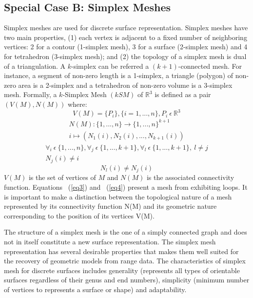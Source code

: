\documentclass{InsightArticle}
\begin{document}
\subsection{Special Case B: Simplex Meshes}
Simplex meshes are used for discrete surface representation. Simplex meshes have two main properties, (1) each vertex is adjacent to a fixed number of neighboring vertices: 2 for a contour (1-simplex mesh), 3 for a surface (2-simplex mesh) and 4 for tetrahedron (3-simplex mesh); and (2) the topology of a simplex mesh is dual of a triangulation. A $k$-simplex can be referred a $(k+1)$-connected mesh. For instance, a segment of non-zero length is a 1-simplex, a triangle (polygon) of non-zero area is a 2-simplex and a tetrahedron of non-zero volume is a 3-simplex mesh. Formally, a $k$-Simplex Mesh $(kSM)$ of $\mathbb{R}^3$ is defined as a pair $(V(M), N(M))$ \cite{Delingette1994} where:
\begin{equation}
	V(M) = \{P_i\}, \{i = 1,..., n\}, P_i\  \epsilon\  \mathbb{R}^3
	\label{eq1}
\end{equation}
\begin{equation}
	\begin{array}{c}
		N(M) : \{1,...,n\} \longrightarrow \{1,...,n\}^{k+1} \\
		i \longmapsto (N_1 (i), N_2 (i),...,N_{k+1} (i))
	\end{array}
	\label{eq2}
\end{equation}
\begin{equation}
	\begin{array}{c}
		\forall _i \ \epsilon \ \{1,...,n\}, \forall _j \ \epsilon \ \{1,...,k+1\}, \forall _l \ \epsilon \ \{1,...,k+1\}, \ l \neq j \\
		N_j (i) \neq i
	\end{array}
	\label{eq3}
\end{equation}
\begin{equation}
	N_l (i) \neq N_j (i)
	\label{eq4}
\end{equation}
$V(M)$ is the set of vertices of $M$ and $N(M)$ is the associated connectivity function. Equations ~(\ref{eq3}) and ~(\ref{eq4}) present a mesh from exhibiting loops. It is important to make a distinction between the topological nature of a mesh represented by its connectivity function N(M) and its geometric nature corresponding to the position of its vertices V(M). 

The structure of a simplex mesh is the one of a simply connected graph and does not in itself constitute a new surface representation. The simplex mesh representation has several desirable properties that makes them well suited for the recovery of geometric models from range data. The characteristics of simplex mesh for discrete surfaces includes generality (represents all types of orientable surfaces regardless of their genus and end numbers), simplicity (minimum number of vertices to represents a surface or shape) and adaptability.
\end{document}
